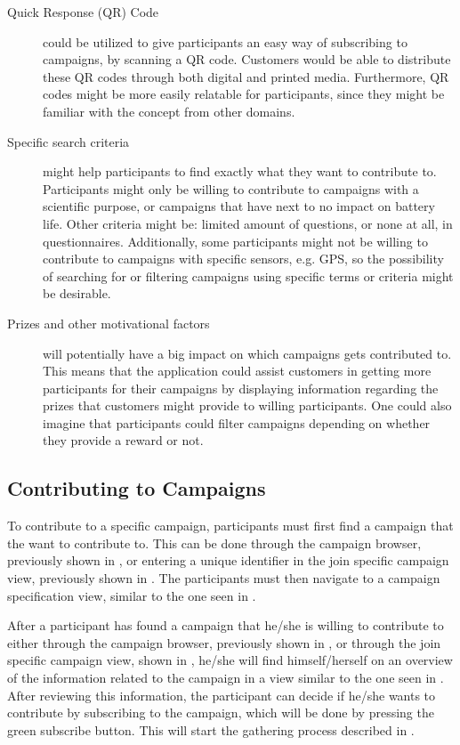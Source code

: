 \begin{description}
    \item[Quick Response (QR) Code] could be utilized to give participants an easy way of subscribing to campaigns, by scanning a QR code. Customers would be able to distribute these QR codes through both digital and printed media. Furthermore, QR codes might be more easily relatable for participants, since they might be familiar with the concept from other domains.

    \item[Specific search criteria] might help participants to find exactly what they want to contribute to. Participants might only be willing to contribute to campaigns with a scientific purpose, or campaigns that have next to no impact on battery life. Other criteria might be: limited amount of questions, or none at all, in questionnaires. Additionally, some participants might not be willing to contribute to campaigns with specific sensors, e.g. GPS, so the possibility of searching for or filtering campaigns using specific terms or criteria might be desirable.

    \item[Prizes and other motivational factors] will potentially have a big impact on which campaigns gets contributed to. This means that the application could assist customers in getting more participants for their campaigns by displaying information regarding the prizes that customers might provide to willing participants. One could also imagine that participants could filter campaigns depending on whether they provide a reward or not.
\end{description} 

\subsection{Contributing to Campaigns}
\label{sub:contributing_to_campaigns}

To contribute to a specific campaign, participants must first find a campaign that the want to contribute to. This can be done through the campaign browser, previously shown in , or entering a unique identifier in the join specific campaign view, previously shown in . The participants must then navigate to a campaign specification view, similar to the one seen in . 

After a participant has found a campaign that he/she is willing to contribute to either through the campaign browser, previously shown in , or through the join specific campaign view, shown in , he/she will find himself/herself on an overview of the information related to the campaign in a view similar to the one seen in . After reviewing this information, the participant can decide if he/she wants to contribute by subscribing to the campaign, which will be done by pressing the green subscribe button. This will start the gathering process described in .

